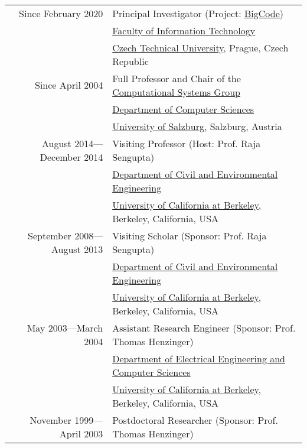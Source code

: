  \\
\begin{tabular}{rl}
Since February 2020 & Principal Investigator (Project: \href{https://bigcode-prl-prg.github.io/index.html}{BigCode})\\
                    & \href{https://www.cvut.cz/en/faculty-of-information-technology}{Faculty of Information Technology} \\
                    & \href{https://www.cvut.cz/en}{Czech Technical University}, Prague, Czech Republic \\
\noalign{\smallskip}
Since April 2004 & Full Professor and Chair of the \href{http://www.cs.uni-salzburg.at/~ck/group}{Computational Systems Group} \\ %
                 & \href{http://www.cs.uni-salzburg.at}{Department of Computer Sciences} \\
                 & \href{http://www.sbg.ac.at}{University of Salzburg}, Salzburg, Austria \\
\noalign{\smallskip}
August 2014---December 2014 & Visiting Professor (Host: Prof. Raja Sengupta)\\
                            & \href{http://www.ce.berkeley.edu}{Department of Civil and Environmental Engineering} \\
                            & \href{http://www.berkeley.edu}{University of California at Berkeley}, Berkeley, California, USA \\
\noalign{\smallskip}
September 2008---August 2013 & Visiting Scholar (Sponsor: Prof. Raja Sengupta)\\
                             & \href{http://www.ce.berkeley.edu}{Department of Civil and Environmental Engineering} \\
                             & \href{http://www.berkeley.edu}{University of California at Berkeley}, Berkeley, California, USA \\
\noalign{\smallskip}
May 2003---March 2004 & Assistant Research Engineer (Sponsor: Prof. Thomas Henzinger)\\
                      & \href{http://www.eecs.berkeley.edu}{Department of Electrical Engineering and Computer Sciences} \\
                      & \href{http://www.berkeley.edu}{University of California at Berkeley}, Berkeley, California, USA \\
\noalign{\smallskip}
November 1999---April 2003 & Postdoctoral Researcher (Sponsor: Prof. Thomas Henzinger)\\

\end{tabular}
